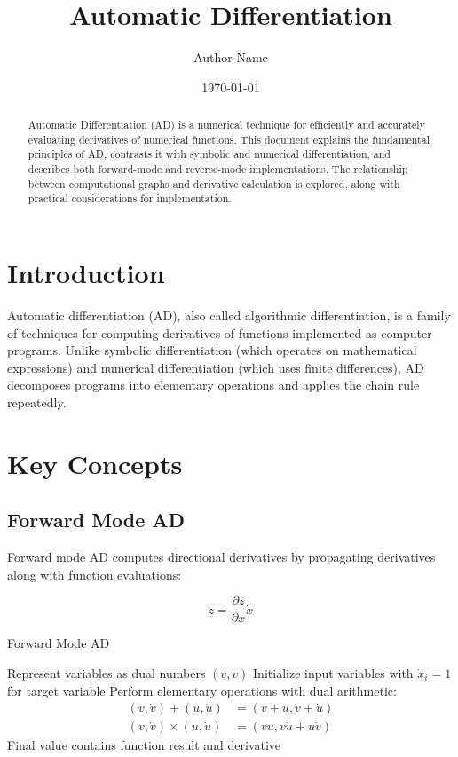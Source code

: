 \documentclass{article}
\title{Automatic Differentiation}
\author{Author Name}
\date{\today}
\begin{document}
\maketitle

\begin{abstract}
Automatic Differentiation (AD) is a numerical technique for efficiently and accurately evaluating derivatives of numerical functions. This document explains the fundamental principles of AD, contrasts it with symbolic and numerical differentiation, and describes both forward-mode and reverse-mode implementations. The relationship between computational graphs and derivative calculation is explored, along with practical considerations for implementation.
\end{abstract}

\section{Introduction}
Automatic differentiation (AD), also called algorithmic differentiation, is a family of techniques for computing derivatives of functions implemented as computer programs. Unlike symbolic differentiation (which operates on mathematical expressions) and numerical differentiation (which uses finite differences), AD decomposes programs into elementary operations and applies the chain rule repeatedly.

\section{Key Concepts}
\subsection{Forward Mode AD}
Forward mode AD computes directional derivatives by propagating derivatives along with function evaluations:

\begin{equation}
\dot{z} = \frac{\partial z}{\partial x} \dot{x}
\end{equation}

\begin{algorithm}
\caption{Forward Mode AD}
\begin{algorithmic}[1]
\State Represent variables as dual numbers $(v, \dot{v})$
\State Initialize input variables with $\dot{x}_i = 1$ for target variable
\State Perform elementary operations with dual arithmetic:
\begin{align*}
(v, \dot{v}) + (u, \dot{u}) &= (v+u, \dot{v}+\dot{u}) \\
(v, \dot{v}) \times (u, \dot{u}) &= (vu, v\dot{u} + u\dot{v})
\end{align*}
\State Final value contains function result and derivative
\end{algorithmic}
\end{algorithm}
\end{document}
